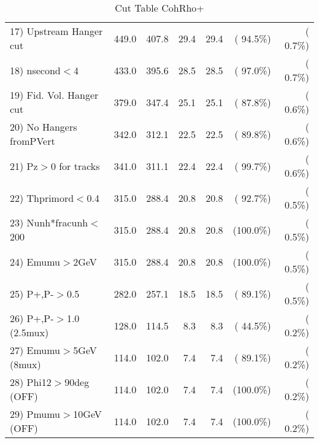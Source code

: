 \begin{table}[h!]
\begin{tabular}{||l||r|r|r|r|r|r||}
 17) Upstream Hanger cut  &        449.0 &        407.8 &         29.4 &         29.4 & ( 94.5\%) & (  0.7\%) \\
 18) nsecond$<$4          &        433.0 &        395.6 &         28.5 &         28.5 & ( 97.0\%) & (  0.7\%) \\
 19) Fid. Vol. Hanger cut &        379.0 &        347.4 &         25.1 &         25.1 & ( 87.8\%) & (  0.6\%) \\
 20) No Hangers fromPVert &        342.0 &        312.1 &         22.5 &         22.5 & ( 89.8\%) & (  0.6\%) \\
 21) Pz$>$0 for tracks    &        341.0 &        311.1 &         22.4 &         22.4 & ( 99.7\%) & (  0.6\%) \\
 22) Thprimord$<$0.4      &        315.0 &        288.4 &         20.8 &         20.8 & ( 92.7\%) & (  0.5\%) \\
 23) Nunh*fracunh$<$200   &        315.0 &        288.4 &         20.8 &         20.8 & (100.0\%) & (  0.5\%) \\
 24) Emumu$>$2GeV         &        315.0 &        288.4 &         20.8 &         20.8 & (100.0\%) & (  0.5\%) \\
 25) P+,P-$>$0.5          &        282.0 &        257.1 &         18.5 &         18.5 & ( 89.1\%) & (  0.5\%) \\
 26) P+,P-$>$1.0 (2.5mux) &        128.0 &        114.5 &          8.3 &          8.3 & ( 44.5\%) & (  0.2\%) \\
 27) Emumu$>$5GeV  (8mux) &        114.0 &        102.0 &          7.4 &          7.4 & ( 89.1\%) & (  0.2\%) \\
 28) Phi12$>$90deg  (OFF) &        114.0 &        102.0 &          7.4 &          7.4 & (100.0\%) & (  0.2\%) \\
 29) Pmumu$>$10GeV  (OFF) &        114.0 &        102.0 &          7.4 &          7.4 & (100.0\%) & (  0.2\%) \\
 \hline
 \hline
 \end{tabular}
 \caption{Cut Table  CohRho+  }
 \label{tab-cutcohjpsi-mumu_anumunc}
 \end{table}
